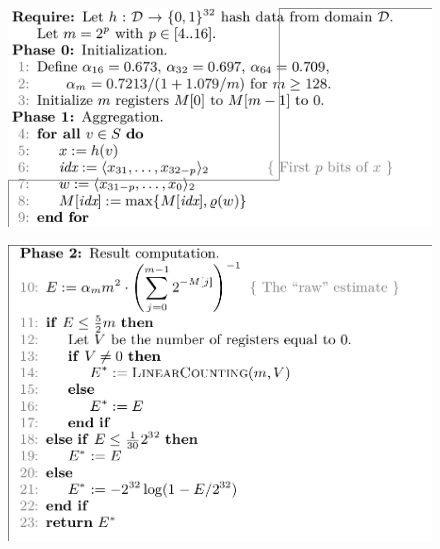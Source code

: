 \documentclass{beamer}
\begin{document}
\begin{frame}
\begin{figure}[H]
\includegraphics[scale=0.3]{HLL1.png}

\end{figure}
\end{frame}
\begin{frame}
\begin{figure}[H]
\includegraphics[scale=0.3]{HLL2.png}
\end{figure}
\end{frame}
\end{document}
